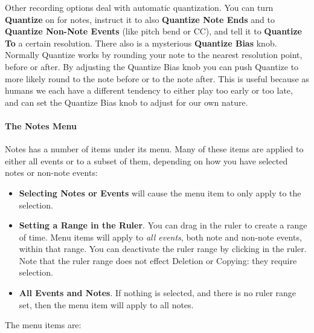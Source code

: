 \documentclass[twoside,10pt]{article}
\begin{document}
Other recording options deal with automatic quantization.  You can turn {\bf Quantize} on for notes, instruct it to also {\bf Quantize Note Ends} and to {\bf Quantize Non-Note Events} (like pitch bend or CC), and tell it to {\bf Quantize To} a certain resolution.  There also is a mysterious {\bf Quantize Bias} knob.  Normally Quantize works by rounding your note to the nearest resolution point, before or after.  By adjusting the Quantize Bias knob you can push Quantize to more likely round to the note before or to the note after.  This is useful because as humans we each have a different tendency to either play too early or too late, and can set the Quantize Bias knob to adjust for our own nature.

\paragraph{The Notes Menu} Notes has a number of items under its menu.  Many of these items are applied to either all events or to a subset of them, depending on how you have selected notes or non-note events: 

\begin{itemize}
\item {\bf Selecting Notes or Events} will cause the menu item to only apply to the selection.
\item {\bf Setting a Range in the Ruler}.  You can drag in the ruler to create a range of time.  Menu items will apply to {\it all events}, both note and non-note events, within that range.  You can deactivate the ruler range by clicking in the ruler.  Note that the ruler range does not effect Deletion or Copying: they require selection.
\item {\bf All Events and Notes}.  If nothing is selected, and there is no ruler range set, then the menu item will apply to all notes.
\end{itemize}

\noindent The menu items are:
\end{document}
